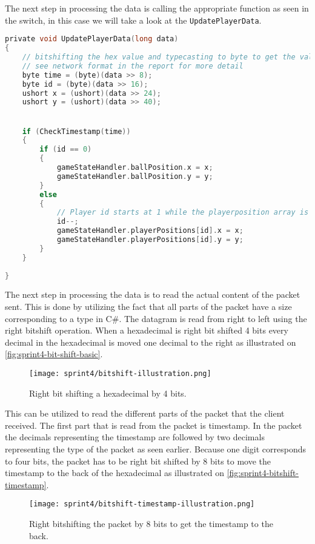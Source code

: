 \noindent 
The next step in processing the data is calling the appropriate function as seen in the switch, in this case we will take a look at the \texttt{UpdatePlayerData}.

\begin{lstlisting}[caption={Updating player data in UDP client}, captionpos=b,language=C,label={lst:updateplayerdata}]
private void UpdatePlayerData(long data)
{
    // bitshifting the hex value and typecasting to byte to get the values.
    // see network format in the report for more detail
    byte time = (byte)(data >> 8);
    byte id = (byte)(data >> 16);
    ushort x = (ushort)(data >> 24);
    ushort y = (ushort)(data >> 40);


    if (CheckTimestamp(time))
    {
        if (id == 0)
        {
            gameStateHandler.ballPosition.x = x;
            gameStateHandler.ballPosition.y = y;
        }
        else
        {
            // Player id starts at 1 while the playerposition array is 0 indexed. Decrementing id so that they line up.
            id--;
            gameStateHandler.playerPositions[id].x = x;
            gameStateHandler.playerPositions[id].y = y;
        }
    }
    
}
\end{lstlisting}
\noindent 
The next step in processing the data is to read the actual content of the packet sent.
This is done by utilizing the fact that all parts of the packet have a size corresponding to a type in C\#.
The datagram is read from right to left using the right bitshift operation.
When a hexadecimal is right bit shifted 4 bits every decimal in the hexadecimal is moved one decimal to the right as illustrated on \autoref{fig:sprint4-bit-shift-basic}.
\begin{figure}[H]
    \centering
    \texttt{[image: sprint4/bitshift-illustration.png]}
    \caption{Right bit shifting a hexadecimal by 4 bits.}
    \label{fig:sprint4-bit-shift-basic}
\end{figure}
This can be utilized to read the different parts of the packet that the client received.
The first part that is read from the packet is timestamp.
In the packet the decimals representing the timestamp are followed by two decimals representing the type of the packet as seen earlier.
Because one digit corresponds to four bits, the packet has to be right bit shifted by 8 bits to move the timestamp to the back of the hexadecimal as illustrated on \autoref{fig:sprint4-bitshift-timestamp}.
\begin{figure}[H]
    \centering
    \texttt{[image: sprint4/bitshift-timestamp-illustration.png]}
    \caption{Right bitshifting the packet by 8 bits to get the timestamp to the back.}
    \label{fig:sprint4-bitshift-timestamp}
\end{figure}

